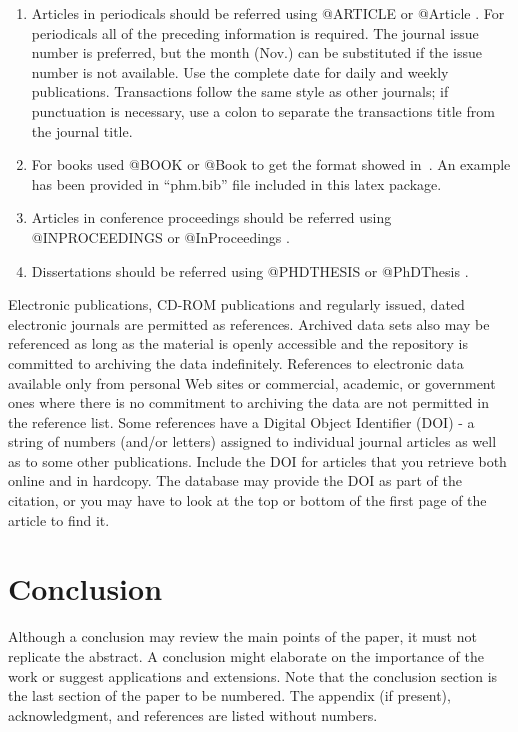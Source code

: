 \documentclass[IJPHM, 2014, 00]{PHMSociety}
\begin{document}
\begin{enumerate}
\item Articles in periodicals should be referred using @ARTICLE or @Article \cite{wunsch}. For periodicals all of the preceding information is required. The journal issue number is preferred, but the month (Nov.) can be substituted if the issue number is not available. Use the complete date for daily and weekly publications. Transactions follow the same style as other journals; if punctuation is necessary, use a colon to separate the transactions title from the journal title.
\item For books used @BOOK or @Book to get the format showed in~\cite{bhattacharyya}. An example has been provided in ``phm.bib'' file included in this latex package.
\item Articles in conference proceedings should be referred using @INPROCEEDINGS or @InProceedings \cite{ferrell}.
\item Dissertations should be referred using @PHDTHESIS or @PhDThesis \cite{chen}.
\end{enumerate}


Electronic publications, CD-ROM publications and regularly issued, dated electronic journals are permitted as references. Archived data sets also may be referenced as long as the material is openly accessible and the repository is committed to archiving the data indefinitely. References to electronic data available only from personal Web sites or commercial, academic, or government ones where there is no commitment to archiving the data are not permitted in the reference list. Some references have a Digital Object Identifier (DOI) - a string of numbers (and/or letters) assigned to individual journal articles as well as to some other publications. Include the DOI for articles that you retrieve both online and in hardcopy. The database may provide the DOI as part of the citation, or you may have to look at the top or bottom of the first page of the article to find it.




\section{Conclusion}
Although a conclusion may review the main points of the paper, it must not replicate the abstract. A conclusion might elaborate on the importance of the work or suggest applications and extensions. Note that the conclusion section is the last section of the paper to be numbered. The appendix (if present), acknowledgment, and references are listed without numbers.
\end{document}
